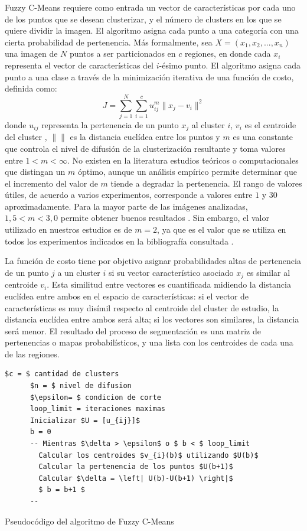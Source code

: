 Fuzzy C-Means requiere como entrada un vector de características por cada uno de los puntos que se desean clusterizar, y el número de clusters en los que se quiere dividir la imagen. El algoritmo asigna cada punto a una categoría con una cierta probabilidad de pertenencia. Más formalmente, sea $ X = (x_1, x_2, ..., x_n)$ una imagen de $N$ puntos a ser particionados en $c$ regiones, en donde cada $x_i$ representa el vector de características del $i$-ésimo punto. El algoritmo asigna cada punto a una clase a través de la minimización iterativa de una función de costo, definida como:
%
\begin{equation}
J = \sum_{j=1}^{N} \sum_{i=1}^{c} u_{ij}^m \lVert x_j- v_i \rVert^2
\end{equation}
%
donde $u_{ij}$ representa la pertenencia de un punto $x_j$ al cluster $i$, $v_i$ es el centroide del cluster , $\lVert \rVert$ es la distancia euclídea entre los puntos y $m$ es una constante que controla el nivel de difusión de la clusterización resultante \citep{chuang2006fuzzy} y toma valores entre $1 < m < \infty$. No existen en la literatura estudios teóricos o computacionales que distingan un $m$ óptimo, aunque un análisis empírico permite determinar que el incremento del valor de $m$ tiende a degradar la pertenencia. El rango de valores útiles, de acuerdo a varios experimentos, corresponde a valores entre $1$ y $30$ aproximadamente. Para la mayor parte de las imágenes analizadas, $1,5 < m < 3,0$ permite obtener buenos resultados \citep{bezdek1984fcm}. Sin embargo, el valor utilizado en nuestros estudios es de $m = 2$, ya que es el valor que se utiliza en todos los experimentos indicados en la bibliografía consultada \citep{caldairou2011non, yang2005fuzzy, chuang2006fuzzy}.

La función de costo tiene por objetivo asignar probabilidades altas de pertenencia de un punto $j$ a un cluster $i$ si su vector característico asociado $x_j$ es similar al centroide $v_i$. Esta similitud entre vectores es cuantificada midiendo la distancia euclídea entre ambos en el espacio de características: si el vector de características es muy disímil respecto al centroide del cluster de estudio, la distancia euclídea entre ambos será alta; si los vectores son similares, la distancia será menor. El resultado del proceso de segmentación es una matriz de pertenencias o mapas probabilísticos, y una lista con los centroides de cada una de las regiones.


\begin{program}[H]
	\begin{lstlisting}[mathescape]
	  $c = $ cantidad de clusters
	  $n = $ nivel de difusion
	  $\epsilon= $ condicion de corte
	  loop_limit = iteraciones maximas	  
	  Inicializar $U = [u_{ij}]$
	  b = 0
	  -- Mientras $\delta > \epsilon$ o $ b < $ loop_limit
	    Calcular los centroides $v_{i}(b)$ utilizando $U(b)$
	    Calcular la pertenencia de los puntos $U(b+1)$
	    Calcular $\delta = \left| U(b)-U(b+1) \right|$
	    $ b = b+1 $
	  --
	\end{lstlisting}
	\caption{Pseudocódigo del algoritmo de Fuzzy C-Means}
	\label{lst:fcm-alg}
\end{program}

